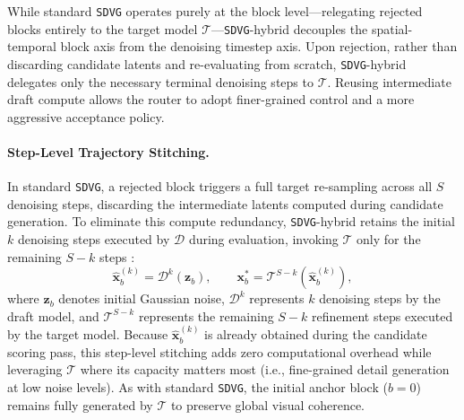 \documentclass{article} %
\begin{document}
While standard \texttt{SDVG} operates purely at the block level—relegating rejected blocks entirely to the target model $\mathcal{T}$—\texttt{SDVG}-hybrid decouples the spatial-temporal block axis from the denoising timestep axis. Upon rejection, rather than discarding candidate latents and re-evaluating from scratch, \texttt{SDVG}-hybrid delegates only the necessary terminal denoising steps to $\mathcal{T}$. Reusing intermediate draft compute allows the router to adopt finer-grained control and a more aggressive acceptance policy.

\paragraph{Step-Level Trajectory Stitching.}
In standard \texttt{SDVG}, a rejected block triggers a full target re-sampling across all $S$ denoising steps, discarding the intermediate latents computed during candidate generation. To eliminate this compute redundancy, \texttt{SDVG}-hybrid retains the initial $k$ denoising steps executed by $\mathcal{D}$ during evaluation, invoking $\mathcal{T}$ only for the remaining $S-k$ steps \citep{pan2024tstitchacceleratingsamplingpretrained}:
\begin{equation}
  \hat{\mathbf{x}}^{(k)}_b = \mathcal{D}^k(\mathbf{z}_b), \qquad \mathbf{x}^*_b = \mathcal{T}^{S-k}\left(\hat{\mathbf{x}}^{(k)}_b\right),
  \label{eq:stitch}
\end{equation}
where $\mathbf{z}_b$ denotes initial Gaussian noise, $\mathcal{D}^k$ represents $k$ denoising steps by the draft model, and $\mathcal{T}^{S-k}$ represents the remaining $S-k$ refinement steps executed by the target model. Because $\hat{\mathbf{x}}^{(k)}_b$ is already obtained during the candidate scoring pass, this step-level stitching adds zero computational overhead while leveraging $\mathcal{T}$ where its capacity matters most (i.e., fine-grained detail generation at low noise levels). As with standard \texttt{SDVG}, the initial anchor block ($b=0$) remains fully generated by $\mathcal{T}$ to preserve global visual coherence.
\end{document}
